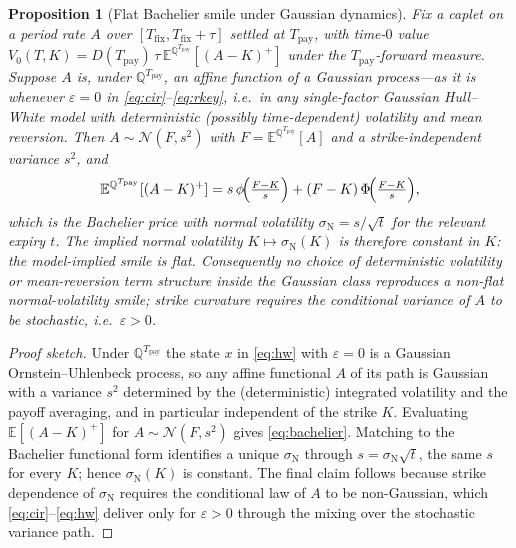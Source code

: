 \documentclass[11pt]{article}
\newcommand{\E}{\mathbb{E}}
\newcommand{\Qmeas}{\mathbb{Q}}
\newcommand{\Fwd}{F}
\newcommand{\Nvol}{\sigma_{\mathrm N}}
\theoremstyle{plain}
\newtheorem{proposition}{Proposition}
\theoremstyle{definition}
\begin{document}
\begin{proposition}[Flat Bachelier smile under Gaussian dynamics]
\label{prop:flat}
Fix a caplet on a period rate $A$ over $[T_{\mathrm{fix}},
T_{\mathrm{fix}}+\tau]$ settled at $T_{\mathrm{pay}}$, with time-$0$ value
$V_0(T,K) = D(T_{\mathrm{pay}})\,\tau\,\E^{\Qmeas^{T_{\mathrm{pay}}}}
[(A-K)^+]$ under the $T_{\mathrm{pay}}$-forward measure. Suppose $A$ is, under
$\Qmeas^{T_{\mathrm{pay}}}$, an affine function of a Gaussian process---as it is
whenever $\varepsilon = 0$ in \eqref{eq:cir}--\eqref{eq:rkey}, i.e.\ in any
single-factor Gaussian Hull--White model with deterministic (possibly
time-dependent) volatility and mean reversion. Then $A \sim
\mathcal{N}(\Fwd, s^2)$ with $\Fwd = \E^{\Qmeas^{T_{\mathrm{pay}}}}[A]$ and a
strike-independent variance $s^2$, and
\begin{equation}
\E^{\Qmeas^{T_{\mathrm{pay}}}}[(A-K)^+]
   = s\,\phi\!\Bigl(\tfrac{\Fwd-K}{s}\Bigr)
   + (\Fwd-K)\,\Phi\!\Bigl(\tfrac{\Fwd-K}{s}\Bigr),
\label{eq:bachelier}
\end{equation}
which is the Bachelier price with normal volatility $\Nvol = s/\sqrt{t}$ for the
relevant expiry $t$. The implied normal volatility $K \mapsto \Nvol(K)$ is
therefore constant in $K$: the model-implied smile is flat. Consequently no
choice of deterministic volatility or mean-reversion term structure inside the
Gaussian class reproduces a non-flat normal-volatility smile; strike curvature
requires the conditional variance of $A$ to be stochastic, i.e.\ $\varepsilon
> 0$.
\end{proposition}

\begin{proof}[Proof sketch]
Under $\Qmeas^{T_{\mathrm{pay}}}$ the state $x$ in \eqref{eq:hw} with
$\varepsilon=0$ is a Gaussian Ornstein--Uhlenbeck process, so any affine
functional $A$ of its path is Gaussian with a variance $s^2$ determined by the
(deterministic) integrated volatility and the payoff averaging, and in
particular independent of the strike $K$. Evaluating $\E[(A-K)^+]$ for
$A\sim\mathcal N(\Fwd,s^2)$ gives \eqref{eq:bachelier}. Matching to the Bachelier
functional form identifies a unique $\Nvol$ through $s = \Nvol\sqrt{t}$, the same
$s$ for every $K$; hence $\Nvol(K)$ is constant. The final claim follows because
strike dependence of $\Nvol$ requires the conditional law of $A$ to be
non-Gaussian, which \eqref{eq:cir}--\eqref{eq:hw} deliver only for
$\varepsilon>0$ through the mixing over the stochastic variance path.
\end{proof}
\end{document}
